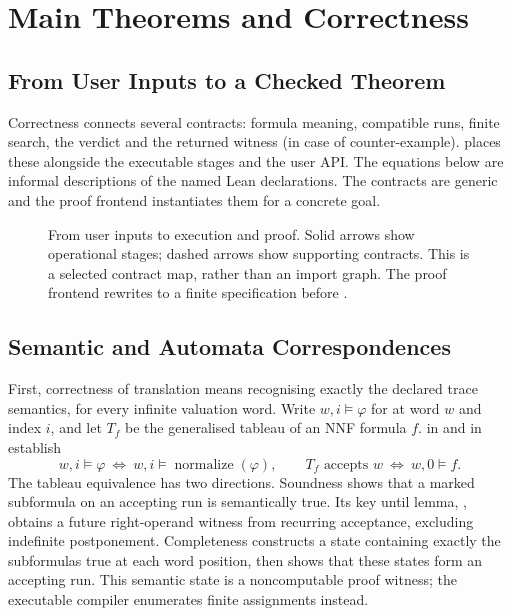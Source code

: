 \clearpage
\section{Main Theorems and Correctness}\label{sec:correctness}

\subsection{From User Inputs to a Checked Theorem}

Correctness connects several contracts: formula meaning, compatible runs,
finite search, the verdict and the returned witness (in case of counter-example).
 places these alongside the executable stages and
the user API. The equations below are informal descriptions of the
named Lean declarations. The contracts are generic and the proof frontend
instantiates them for a concrete goal.

\begin{figure}[!ht]
  \centering
  
  \caption{From user inputs to execution and proof. Solid arrows show operational
    stages; dashed arrows show supporting contracts. This is a selected
    contract map, rather than an import graph. The proof frontend rewrites to a
    finite specification before .}
  \label{fig:correctness-map}
\end{figure}

\clearpage
\subsection{Semantic and Automata Correspondences}

First, correctness of translation means recognising exactly the declared trace
semantics, for every infinite valuation word.  Write $w,i\models\varphi$ for
 at word $w$ and index $i$, and let $T_f$ be the generalised tableau of an NNF formula
$f$.   in  and
 in  establish
\[
  w,i\models\varphi\ \Longleftrightarrow\ w,i\models\operatorname{normalize}(\varphi),
  \qquad
  T_f\text{ accepts }w\ \Longleftrightarrow\ w,0\models f.
\]
The tableau equivalence has two directions.  Soundness shows that a marked
subformula on an accepting run is semantically true.  Its key until lemma,
, obtains a future right-operand witness from recurring
acceptance, excluding indefinite postponement.  Completeness constructs a
state containing exactly the subformulas true at each word position, then
shows that these states form an accepting run.  This semantic state is a
noncomputable proof witness; the executable compiler enumerates finite
assignments instead.

